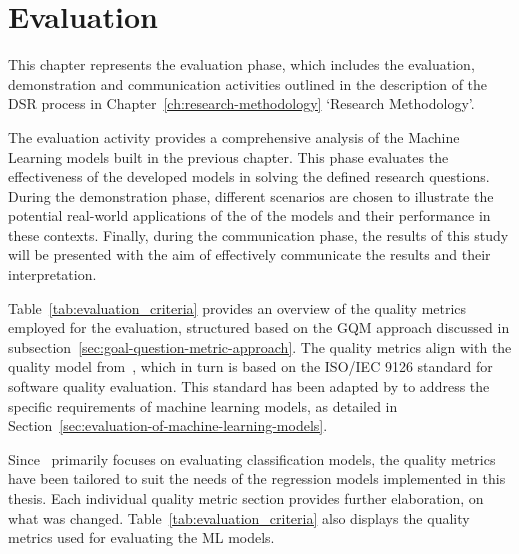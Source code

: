 \chapter{Evaluation}\label{ch:evaluation}
This chapter represents the evaluation phase, which includes the evaluation, demonstration and
communication activities outlined in the description of the \ac{DSR} process in
Chapter~\ref{ch:research-methodology} `Research Methodology'.

The evaluation activity provides a comprehensive analysis of the Machine Learning models built in the
previous chapter.
This phase evaluates the effectiveness of the developed models in solving the defined research questions.
During the demonstration phase, different scenarios are chosen to illustrate the potential real-world applications of
the
of the models and their performance in these contexts.
Finally, during the communication phase, the results of this study will be presented with the aim of effectively
communicate the results and their interpretation.

Table~\ref{tab:evaluation_criteria} provides an overview of the quality metrics employed for the evaluation,
structured based on the \ac{GQM} approach discussed in subsection~\ref{sec:goal-question-metric-approach}.
The quality metrics align with the quality model from~\cite{siebert2022construction}, which in turn is based on
the ISO/IEC 9126 standard for software quality evaluation.
This standard has been adapted by\cite{siebert2022construction} to address the specific requirements of machine
learning models, as detailed in Section~\ref{sec:evaluation-of-machine-learning-models}.

Since~\cite{siebert2022construction} primarily focuses on evaluating classification models, the quality metrics have
been tailored to suit the needs of the regression models implemented in this thesis.
Each individual quality metric section provides further elaboration, on what was changed.
Table~\ref{tab:evaluation_criteria} also displays the quality metrics used for evaluating the \ac{ML} models.


